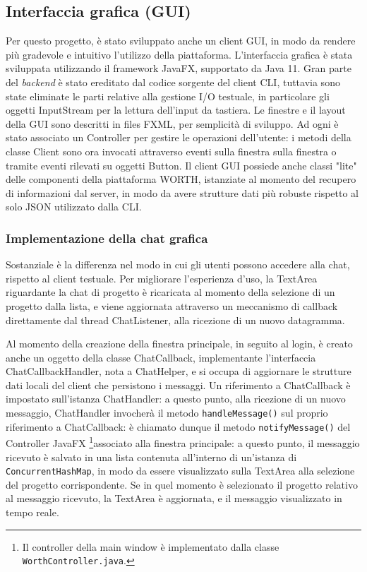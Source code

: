 \documentclass{article}
\begin{document}
\subsection{Interfaccia grafica (GUI)}
Per questo progetto, è stato sviluppato anche un client GUI, in modo da rendere più gradevole e intuitivo l'utilizzo della piattaforma. L'interfaccia grafica è stata sviluppata utilizzando il framework JavaFX, supportato da Java 11. Gran parte del \emph{backend} è stato ereditato dal codice sorgente del client CLI, tuttavia sono state eliminate le parti relative alla gestione I/O testuale, in particolare gli oggetti InputStream per la lettura dell'input da tastiera.
Le finestre e il layout della GUI sono descritti in files FXML, per semplicità di sviluppo. Ad ogni è stato associato un Controller per gestire le operazioni dell'utente: i metodi della classe Client sono ora invocati attraverso eventi sulla finestra sulla finestra o tramite eventi rilevati su oggetti Button. Il client GUI possiede anche classi "lite" delle componenti della piattaforma WORTH, istanziate al momento del recupero di informazioni dal server, in modo da avere strutture dati più robuste rispetto al solo JSON utilizzato dalla CLI.

\subsubsection{Implementazione della chat grafica}
Sostanziale è la differenza nel modo in cui gli utenti possono accedere alla chat, rispetto al client testuale. Per migliorare l'esperienza d'uso, la TextArea riguardante la chat di progetto è ricaricata al momento della selezione di un progetto dalla lista, e viene aggiornata attraverso un meccanismo di callback direttamente dal thread ChatListener, alla ricezione di un nuovo datagramma.

 Al momento della creazione della finestra principale, in seguito al login, è creato anche un oggetto della classe ChatCallback, implementante l'interfaccia ChatCallbackHandler, nota a ChatHelper, e si occupa di aggiornare le strutture dati locali del client che persistono i messaggi. Un riferimento a ChatCallback è impostato sull'istanza ChatHandler: a questo punto, alla ricezione di un nuovo messaggio, ChatHandler invocherà il metodo \texttt{handleMessage()} sul proprio riferimento a ChatCallback: è chiamato dunque il metodo \texttt{notifyMessage()} del Controller JavaFX \footnote{Il controller della main window è implementato dalla classe \texttt{WorthController.java}.}associato alla finestra principale: a questo punto, il messaggio ricevuto è salvato in una lista contenuta all'interno di un'istanza di \texttt{ConcurrentHashMap}, in modo da essere visualizzato sulla TextArea alla selezione del progetto corrispondente. Se in quel momento è selezionato il progetto relativo al messaggio ricevuto, la TextArea è aggiornata, e il messaggio visualizzato in tempo reale.\newline
 
\end{document}

